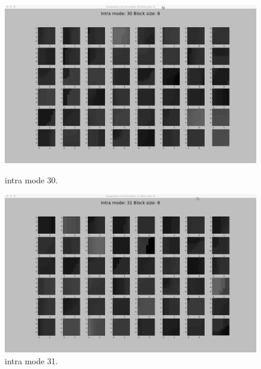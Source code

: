 \begin{figure}[H]
    \begin{minipage}{0.49\textwidth}
        \includegraphics[width=\linewidth]{Figures/visu-size8x8/8-30}
        \caption[Intra mode 30]{intra mode 30.}
        \label{fig:size8_mode30}
    \end{minipage}
    \hspace{\fill} %
    \begin{minipage}{0.49\textwidth}
        \includegraphics[width=\linewidth]{Figures/visu-size8x8/8-31}
        \caption[Intra mode 31]{intra mode 31.}
        \label{fig:size8_mode31}
    \end{minipage}
    
    \vspace*{1cm} %


\end{figure}
